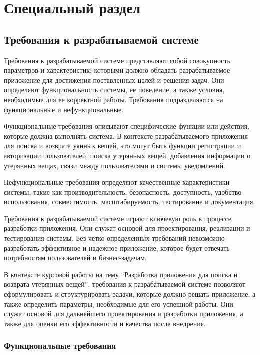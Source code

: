 \section{Специальный раздел}
\label{sec:special}

\subsection{Требования к разрабатываемой системе}

Требования к разрабатываемой системе представляют собой совокупность параметров и характеристик, которыми должно обладать разрабатываемое приложение для достижения поставленных целей и решения задач. Они определяют функциональность системы, ее поведение, а также условия, необходимые для ее корректной работы. Требования подразделяются на функциональные и нефункциональные.

Функциональные требования описывают специфические функции или действия, которые должна выполнять система. В контексте разрабатываемого приложения для поиска и возврата уянных вещей, это могут быть функции регистрации и авторизации пользователей, поиска утерянных вещей, добавления информации о утерянных вещах, связи между пользователями и системы уведомлений.

Нефункциональные требования определяют качественные характеристики системы, такие как производительность, безопасность, доступность, удобство использования, совместимость, масштабируемость, тестирование и документация.

Требования к разрабатываемой системе играют ключевую роль в процессе разработки приложения. Они служат основой для проектирования, реализации и тестирования системы. Без четко определенных требований невозможно разработать эффективное и надежное приложение, которое будет отвечать потребностям пользователей и бизнес-задачам.

В контексте курсовой работы на тему “Разработка приложения для поиска и возврата утерянных вещей”, требования к разрабатываемой системе позволяют сформулировать и структурировать задачи, которые должно решать приложение, а также определить параметры, необходимые для его успешной работы. Они служат основой для дальнейшего проектирования и разработки приложения, а также для оценки его эффективности и качества после внедрения.

\subsubsection{Функциональные требования}

